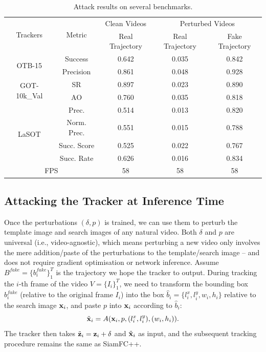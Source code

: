 \documentclass{article}
\begin{document}
\begin{table}[thbp]
\centering
\scriptsize
\tabcolsep=2.0pt
\begin{tabular}{c c | c | c | c}
\toprule
\multirow{2}{*}[-2pt]{Trackers} & \multirow{2}{*}[-2pt]{Metric} & Clean Videos    & \multicolumn{2}{c}{Perturbed Videos}  \\
\cmidrule{3-5}
                          &                         & Real Trajectory & Real Trajectory & Fake Trajectory     \\ 
\midrule
\multirow{2}{*}{OTB-15} 
& Success   & 0.642 & 0.035 & 0.842\\
& Precision & 0.861 & 0.048 & 0.928\\
\midrule
\multirow{2}{*}{GOT-10k\_Val} 
& SR & 0.897 & 0.023 & 0.890\\
& AO 				   & 0.760 & 0.035 & 0.818 \\
\midrule
\multirow{4}{*}{LaSOT} 
& Prec.       & 0.514 & 0.013 & 0.820\\
& Norm. Prec. & 0.551 & 0.015 & 0.788\\
& Succ. Score & 0.525 & 0.022 & 0.767\\
& Succ. Rate  & 0.626 & 0.016 & 0.834\\
\midrule
\multicolumn{2}{c|}{FPS} & 58 & 58 & 58\\
\bottomrule
\end{tabular}
\caption{Attack results on several benchmarks.}
\label{tab:benchmark results}
\end{table}

\subsection{Attacking the Tracker at Inference Time}

Once the perturbations $(\delta, p)$ is trained, we can use them to perturb the template image and search images of any natural video. Both $\delta$ and $p$ are universal (i.e., video-agnostic), which means perturbing a new video only involves the mere addition/paste of the perturbations to the template/search image -- and does not require gradient optimisation or network inference.
Assume $B^{fake}=\{b^{fake}_i\}_1^{T}$ is the trajectory we hope the tracker to output.
During tracking the $i$-th frame of the video $V=\{I_i\}_1^T$, we need to transform the bounding box $b^{fake}_i$ (relative to the original frame $I_i$) into the box $\hat b_i=\{l^x_i, l^y_i, w_i, h_i\}$ relative to the search image $\textbf x_i$, and paste $p$ into $\textbf x_i$ according to $\hat b_i$:
\begin{equation}
\tilde{\textbf x}_i = A(\textbf x_i, p, (l^x_i, l^y_i), (w_i, h_i)).
\end{equation}
The tracker then takes $\tilde{\textbf z}_i=\textbf z_i+\delta$ and $\tilde{ \textbf x}_i$ as input, and the subsequent tracking procedure remains the same as SiamFC++.
\end{document}
